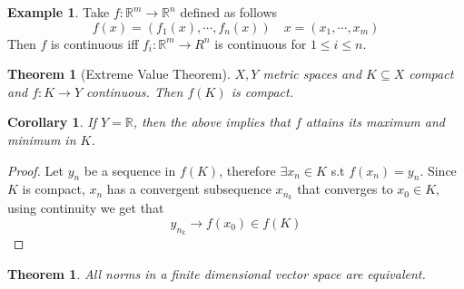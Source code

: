 \documentclass[11pt,a4paper]{article}
\theoremstyle{definition}
\newtheorem{example}[definition]{Example}
\theoremstyle{plain}
\newtheorem{theorem}[definition]{Theorem}
\newtheorem{corollary}[definition]{Corollary}
\theoremstyle{remark}
\newcommand{\R}{\mathbb{R}}
\begin{document}
\begin{example}
    Take $f \colon \R^m \to \R^n$ defined as follows 
    $$f(x) = (f_1(x), \cdots, f_n(x)) \quad x = (x_1, \cdots, x_m)$$
    Then $f$ is continuous iff $f_i \colon \R^m \to R^n$ is continuous for $1 \le i \le n$. 
\end{example}

\begin{theorem}[Extreme Value Theorem]
    $X,Y$ metric spaces and $K \subseteq X$ compact and $f \colon K \to Y$ continuous. Then 
    $f(K)$ is compact. 
\end{theorem}

\begin{corollary}
    If $Y = \R$, then the above implies that $f$ attains its maximum and minimum in $K$. 
\end{corollary}

\begin{proof}
    Let $y_n$ be a sequence in $f(K)$, therefore $\exists x_n \in K$ s.t 
    $f(x_n) = y_n$. Since $K$ is compact, $x_n$ has a convergent subsequence $x_{n_k}$ that converges to $x_0 \in K$, using continuity we get that 
    $$y_{n_k} \to f(x_0) \in f(K)$$
\end{proof}

\begin{theorem}
    All norms in a finite dimensional vector space are equivalent. 
\end{theorem}
\end{document}

